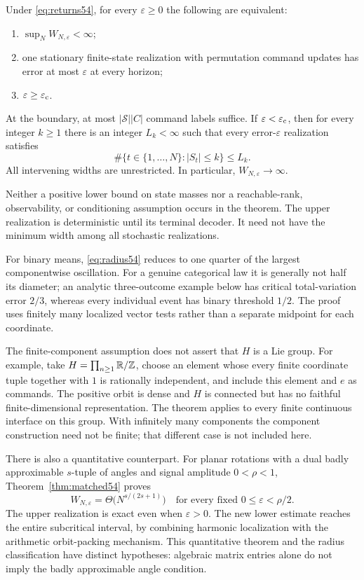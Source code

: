 \begin{theorem}\label{thm:radius54}
Under \eqref{eq:returns54}, for every $\varepsilon\ge0$ the following are equivalent:
\begin{enumerate}
\item $\sup_N W_{N,\varepsilon}<\infty$;
\item one stationary finite-state realization with permutation command updates has error at most $\varepsilon$ at every horizon;
\item $\varepsilon\ge\varepsilon_{\mathrm c}$.
\end{enumerate}
At the boundary, at most $|\mathcal S||C|$ command labels suffice. If $\varepsilon<\varepsilon_{\mathrm c}$, then for every integer $k\ge1$ there is an integer $L_k<\infty$ such that every error-$\varepsilon$ realization satisfies
\begin{equation}\label{eq:occupation54}
 \#\{t\in\{1,\ldots,N\}:|S_t|\le k\}\le L_k.
\end{equation}
All intervening widths are unrestricted. In particular, $W_{N,\varepsilon}\to\infty$.
\end{theorem}
Neither a positive lower bound on state masses nor a reachable-rank, observability, or conditioning assumption occurs in the theorem. The upper realization is deterministic until its terminal decoder. It need not have the minimum width among all stochastic realizations.

For binary means, \eqref{eq:radius54} reduces to one quarter of the largest componentwise oscillation. For a genuine categorical law it is generally not half its diameter; an analytic three-outcome example below has critical total-variation error $2/3$, whereas every individual event has binary threshold $1/2$. The proof uses finitely many localized vector tests rather than a separate midpoint for each coordinate.

The finite-component assumption does not assert that $H$ is a Lie group. For example, take $H=\prod_{n\ge1}\mathbb R/\mathbb Z$, choose an element whose every finite coordinate tuple together with $1$ is rationally independent, and include this element and $e$ as commands. The positive orbit is dense and $H$ is connected but has no faithful finite-dimensional representation. The theorem applies to every finite continuous interface on this group. With infinitely many components the component construction need not be finite; that different case is not included here.

There is also a quantitative counterpart. For planar rotations with a dual badly approximable $s$-tuple of angles and signal amplitude $0<\rho<1$, Theorem~\ref{thm:matched54} proves
\[
 W_{N,\varepsilon}=\Theta\bigl(N^{s/(2s+1)}\bigr)
 \quad\text{for every fixed }0\le\varepsilon<\rho/2.
\]
The upper realization is exact even when $\varepsilon>0$. The new lower estimate reaches the entire subcritical interval, by combining harmonic localization with the arithmetic orbit-packing mechanism. This quantitative theorem and the radius classification have distinct hypotheses: algebraic matrix entries alone do not imply the badly approximable angle condition.

